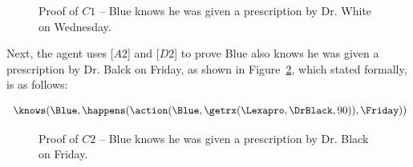 \begin{figure}[h!] 
\vspace{6pt}
\centering
{}
\caption{Proof of $C1$ -- Blue knows he was given a prescription by Dr. White on 
Wednesday.}
\label{fig:proof_of_c1}
\end{figure}

\noindent Next, the agent uses [$A2$] and [$D2$] to prove Blue also knows he was given a prescription by Dr. Balck on Friday, as shown in Figure~\ref{fig:proof_of_c2}, which stated formally, is as follows:
\begin{footnotesize}
\begin{align*}
[C2] \ \knows(\Blue,\happens(\action(\Blue,\getrx(\Lexapro,\DrBlack,90)),\Friday))
\end{align*}
\end{footnotesize}

\begin{figure}[h!] 
\vspace{6pt}
\centering
{}
\caption{Proof of $C2$ -- Blue knows he was given a prescription by Dr. Black on 
Friday.}
\label{fig:proof_of_c2}
\end{figure}

